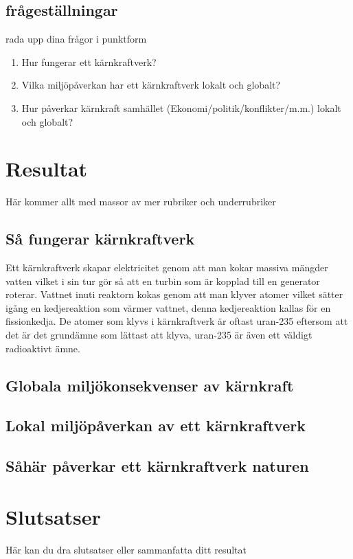 \documentclass[11p]{article}
\begin{document}
    \subsection{frågeställningar}
    rada upp dina frågor i punktform
    \begin{enumerate}
        \item Hur fungerar ett kärnkraftverk?
        \item Vilka miljöpåverkan har ett kärnkraftverk lokalt och globalt?
        \item Hur påverkar kärnkraft samhället (Ekonomi/politik/konflikter/m.m.) lokalt och globalt?
    \end{enumerate}

    \section{Resultat}
    Här kommer allt med massor av mer rubriker och underrubriker
    \subsection{Så fungerar kärnkraftverk}
    Ett kärnkraftverk skapar elektricitet genom att man kokar massiva mängder vatten vilket i sin tur gör så att en turbin som är kopplad till en generator roterar.
    Vattnet inuti reaktorn kokas genom att man klyver atomer vilket sätter igång en kedjereaktion som värmer vattnet, denna kedjereaktion kallas för en fissionkedja.
    De atomer som klyvs i kärnkraftverk är oftast uran-235 eftersom att det är det grundämne som lättast att klyva, uran-235 är även ett väldigt radioaktivt ämne.

    \subsection{Globala miljökonsekvenser av kärnkraft}
    \subsection{Lokal miljöpåverkan av ett kärnkraftverk}
    \subsection{Såhär påverkar ett kärnkraftverk naturen}
    \subsection{}

    \section{Slutsatser}
    Här kan du dra slutsatser eller sammanfatta ditt resultat
\end{document}
